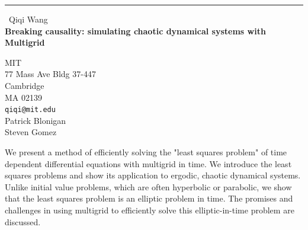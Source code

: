 \documentclass{report}
\begin{document}
\begin{center}
\rule{6in}{1pt} \
{\large Qiqi Wang \\
{\bf Breaking causality: simulating chaotic dynamical systems with Multigrid}}

MIT \\ 77 Mass Ave Bldg 37-447 \\ Cambridge \\ MA 02139
\\
{\tt qiqi@mit.edu}\\
Patrick Blonigan\\
Steven Gomez\end{center}

We present a method of efficiently solving the "least squares problem" of
time dependent differential equations with multigrid in time. We
introduce the least squares problems and show its application to ergodic,
chaotic dynamical systems. Unlike initial value problems, which are often
hyperbolic or parabolic, we show that the least squares problem is an
elliptic problem in time. The promises and challenges in using multigrid
to efficiently solve this elliptic-in-time problem are discussed.
\end{document}
